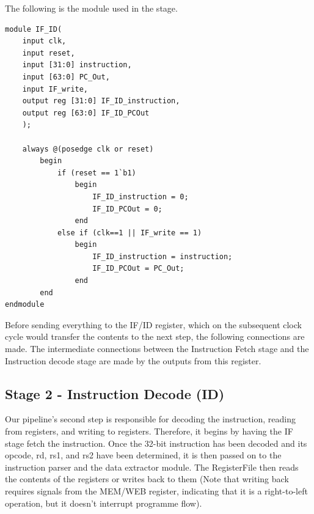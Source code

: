 \documentclass{article}
\begin{document}
The following is the module used in the stage. 

\begin{lstlisting}[caption={IF/ID Register}, captionpos=b, language=RISC-V]
module IF_ID(
    input clk,
    input reset,
    input [31:0] instruction,
    input [63:0] PC_Out,
    input IF_write,
    output reg [31:0] IF_ID_instruction,
    output reg [63:0] IF_ID_PCOut
    );
    
    always @(posedge clk or reset)
        begin
            if (reset == 1`b1)
                begin
                    IF_ID_instruction = 0;
                    IF_ID_PCOut = 0;
                end
            else if (clk==1 || IF_write == 1)
                begin
                    IF_ID_instruction = instruction;
                    IF_ID_PCOut = PC_Out;
                end
        end   
endmodule
\end{lstlisting}

Before sending everything to the IF/ID register, which on the subsequent clock cycle would transfer the contents to the next step, the following connections are made. The intermediate connections between the Instruction Fetch stage and the Instruction decode stage are made by the outputs from this register.

\subsection{Stage 2 - Instruction Decode (ID)}

Our pipeline's second step is responsible for decoding the instruction, reading from registers, and writing to registers. Therefore, it begins by having the IF stage fetch the instruction. Once the 32-bit instruction has been decoded and its opcode, rd, rs1, and rs2 have been determined, it is then passed on to the instruction parser and the data extractor module. The RegisterFile then reads the contents of the registers or writes back to them (Note that writing back requires signals from the MEM/WEB register, indicating that it is a right-to-left operation, but it doesn't interrupt programme flow).
\end{document}
